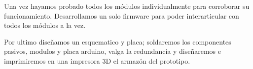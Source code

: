 \par \noindent
Una vez hayamos probado todos los módulos individualmente para corroborar su funcionamiento. Desarrollamos un solo firmware para poder interarticular con todos los módulos a la vez. 

\par \noindent
Por ultimo diseñamos un esquematico y placa; soldaremos los componentes pasivos, modulos y placa arduino, valga la redundancia y diseñaremos e imprimiremos en una impresora 3D el armazón del prototipo.



